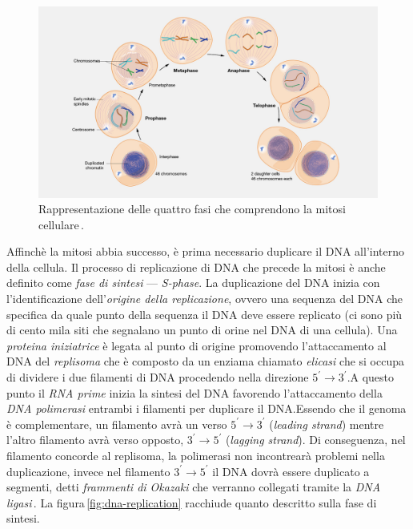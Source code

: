\begin{figure}[b!]
    \centering
    \includegraphics[width=\textwidth]{assets/mitosis.jpg}
    \caption[La mitosi cellulare.]{Rappresentazione delle quattro fasi che comprendono la mitosi cellulare\,\cite{nhgri_mitosis_image}.}\label{fig:mitosis}
\end{figure}

Affinchè la mitosi abbia successo, è prima necessario duplicare il DNA all'interno della cellula. Il processo di replicazione di DNA che precede la mitosi è anche definito come \textsl{fase di sintesi} — \textit{S-phase}. La duplicazione del DNA inizia con l'identificazione dell'\textsl{origine della replicazione}, ovvero una sequenza del DNA che specifica da quale punto della sequenza il DNA deve essere replicato (ci sono più di cento mila siti che segnalano un punto di orine nel DNA di una cellula). Una \textsl{proteina iniziatrice} è legata al punto di origine promovendo l'attaccamento al DNA del \textsl{replisoma} che è composto da un enziama chiamato \textsl{elicasi} che si occupa di dividere i due filamenti di DNA procedendo nella direzione $5^\prime \to 3^\prime$.\@ A questo punto il \textsl{RNA prime} inizia la sintesi del DNA favorendo l'attaccamento della \textsl{DNA polimerasi} entrambi i filamenti per duplicare il DNA.\@ Essendo che il genoma è complementare, un filamento avrà un verso $5^\prime \to 3^\prime$ (\textit{leading strand}) mentre l'altro filamento avrà verso opposto, $3^\prime \to 5^\prime$ (\textit{lagging strand}). Di conseguenza, nel filamento concorde al replisoma, la polimerasi non incontrearà problemi nella duplicazione, invece nel filamento $3^\prime \to 5^\prime$ il DNA dovrà essere duplicato a segmenti, detti \textsl{frammenti di Okazaki} che verranno collegati tramite la \textsl{DNA ligasi}\,\cite{laskey1989s, bell2002dna, dutta1997initiation, pollard2022cell}. La figura\,\ref{fig:dna-replication} racchiude quanto descritto sulla fase di sintesi.

